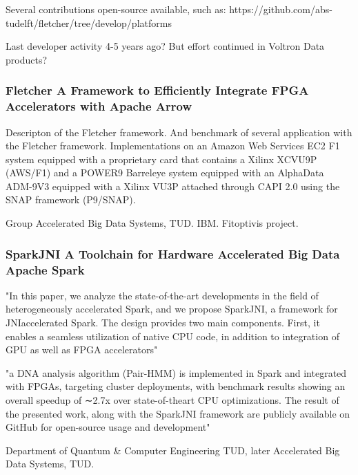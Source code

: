 Several contributions open-source available, such as: https://github.com/abs-tudelft/fletcher/tree/develop/platforms

Last developer activity 4-5 years ago?
But effort continued in Voltron Data products?




\subsubsection{Fletcher A Framework to Efficiently Integrate FPGA Accelerators with Apache Arrow}
\cite{Peltenburg2019Fletcher:Arrow}
Descripton of the Fletcher framework. And benchmark of several application with the Fletcher framework. 
Implementations on an Amazon Web Services EC2
F1 system equipped with a proprietary card that contains a Xilinx
XCVU9P (AWS/F1) and a POWER9 Barreleye system equipped with
an AlphaData ADM-9V3 equipped with a Xilinx VU3P attached
through CAPI 2.0 using the SNAP framework (P9/SNAP).

Group Accelerated Big Data Systems, TUD. IBM. Fitoptivis project.



\subsubsection{SparkJNI A Toolchain for Hardware Accelerated Big Data Apache Spark}
\cite{Voicu2019SparkJNI:Spark}
"In this paper, we analyze the
state-of-the-art developments in the field of heterogeneously accelerated
Spark, and we propose SparkJNI, a framework for JNIaccelerated
Spark. The design provides two main components.
First, it enables a seamless utilization of native CPU code, in
addition to integration of GPU as well as FPGA accelerators"

"a DNA analysis
algorithm (Pair-HMM) is implemented in Spark and integrated
with FPGAs, targeting cluster deployments, with benchmark
results showing an overall speedup of ∼2.7x over state-of-theart
CPU optimizations. The result of the presented work, along
with the SparkJNI framework are publicly available on GitHub
for open-source usage and development"

Department of Quantum & Computer Engineering TUD, later Accelerated Big Data Systems, TUD.

